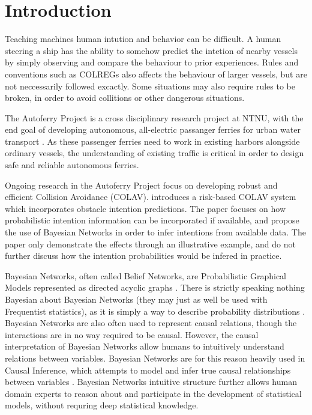 \chapter{Introduction}

 Teaching machines human intution and behavior can be difficult. A human steering a ship has the ability to somehow predict the intetion of nearby vessels by simply observing and compare the behaviour to prior experiences. Rules and conventions such as COLREGs \cite{colreg} also affects the behaviour of larger vessels, but are not neccessarily followed excactly. Some situations may also require rules to be broken, in order to avoid collitions or other dangerous situations. 
 
 The Autoferry Project is a cross disciplinary research project at NTNU, with the end goal of developing autonomous, all-electric passanger ferries for urban water transport \cite{autoferry}. As these passenger ferries need to work in existing harbors alongside ordinary vessels, the understanding of existing traffic is critical in order to design safe and reliable autonomous ferries.
 
 Ongoing research in the Autoferry Project focus on developing robust and efficient Collision Avoidance (COLAV). \cite{Tengesdal2020RiskbasedAM} introduces a risk-based COLAV system which incorporates obstacle intention predictions. The paper focuses on how probabilistic intention information can be incorporated if available, and propose the use of Bayesian Networks in order to infer intentions from available data. The paper only demonstrate the effects through an illustrative example, and do not further discuss how the intention probabilities would be infered in practice.

 Bayesian Networks, often called Belief Networks, are Probabilistic Graphical Models represented as directed acyclic graphs \cite{murphy}. There is strictly speaking nothing Bayesian about Bayesian Networks (they may just as well be used with Frequentist statistics), as it is simply a way to describe probability distributions \cite{murphy}. Bayesian Networks are also often used to represent causal relations, though the interactions are in no way required to be causal. However, the causal interpretation of Bayesian Networks allow humans to intuitively understand relations between variables. Bayesian Networks are for this reason heavily used in Causal Inference, which attempts to model and infer true causal relationships between variables \cite{causal}. Bayesian Networks intuitive structure further allows human domain experts to reason about and participate in the development of statistical models, without requring deep statistical knowledge. 
 
